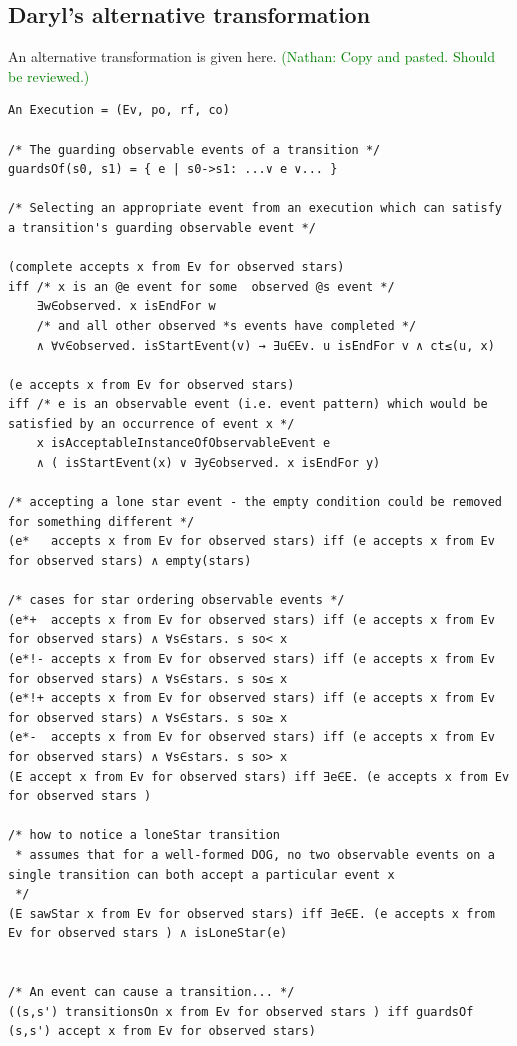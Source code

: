 \documentclass[10pt]{paper}
\newcommand{\NCComment}[1]{\textcolor{green}{(Nathan: #1)}}
\begin{document}
\subsection{Daryl's alternative transformation}

An alternative transformation is given here.
%
\NCComment{Copy and pasted. Should be reviewed.}
%
\begin{verbatim}
An Execution = (Ev, po, rf, co)

/* The guarding observable events of a transition */
guardsOf(s0, s1) = { e | s0->s1: ...∨ e ∨... }

/* Selecting an appropriate event from an execution which can satisfy a transition's guarding observable event */

(complete accepts x from Ev for observed stars)
iff /* x is an @e event for some  observed @s event */
    ∃w∈observed. x isEndFor w
    /* and all other observed *s events have completed */
    ∧ ∀v∈observed. isStartEvent(v) → ∃u∈Ev. u isEndFor v ∧ ct≤(u, x)

(e accepts x from Ev for observed stars)
iff /* e is an observable event (i.e. event pattern) which would be satisfied by an occurrence of event x */
    x isAcceptableInstanceOfObservableEvent e
    ∧ ( isStartEvent(x) ∨ ∃y∈observed. x isEndFor y)

/* accepting a lone star event - the empty condition could be removed for something different */
(e*   accepts x from Ev for observed stars) iff (e accepts x from Ev for observed stars) ∧ empty(stars)

/* cases for star ordering observable events */
(e*+  accepts x from Ev for observed stars) iff (e accepts x from Ev for observed stars) ∧ ∀s∈stars. s so< x
(e*!- accepts x from Ev for observed stars) iff (e accepts x from Ev for observed stars) ∧ ∀s∈stars. s so≤ x
(e*!+ accepts x from Ev for observed stars) iff (e accepts x from Ev for observed stars) ∧ ∀s∈stars. s so≥ x
(e*-  accepts x from Ev for observed stars) iff (e accepts x from Ev for observed stars) ∧ ∀s∈stars. s so> x
(E accept x from Ev for observed stars) iff ∃e∈E. (e accepts x from Ev for observed stars )

/* how to notice a loneStar transition
 * assumes that for a well-formed DOG, no two observable events on a single transition can both accept a particular event x
 */
(E sawStar x from Ev for observed stars) iff ∃e∈E. (e accepts x from Ev for observed stars ) ∧ isLoneStar(e)


/* An event can cause a transition... */
((s,s') transitionsOn x from Ev for observed stars ) iff guardsOf (s,s') accept x from Ev for observed stars)


\end{verbatim}
\end{document}

